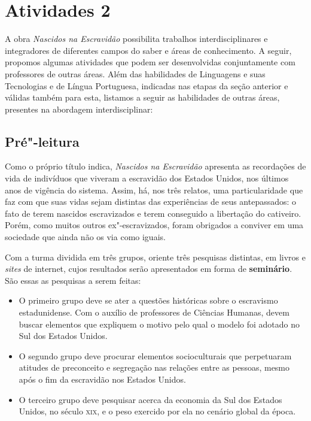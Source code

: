 \documentclass[12pt]{extarticle}
\begin{document}
\section{Atividades 2}

A obra \emph{Nascidos na Escravidão} possibilita trabalhos
interdisciplinares e integradores de diferentes campos do saber e áreas
de conhecimento. A seguir, propomos algumas atividades que podem ser
desenvolvidas conjuntamente com professores de outras áreas. Além das
habilidades de Linguagens e suas Tecnologias e de Língua Portuguesa,
indicadas nas etapas da seção anterior e válidas também para esta,
listamos a seguir as habilidades de outras áreas, presentes na abordagem
interdisciplinar:

\subsection{Pré"-leitura}


Como o próprio título indica, \emph{Nascidos na Escravidão}
apresenta as recordações de vida de indivíduos que viveram a escravidão
dos Estados Unidos, nos últimos anos de vigência do sistema. Assim, há,
nos três relatos, uma particularidade que faz com que suas vidas sejam
distintas das experiências de seus antepassados: o fato de terem
nascidos escravizados e terem conseguido a libertação do cativeiro.
Porém, como muitos outros ex"-escravizados, foram obrigados a conviver em
uma sociedade que ainda não os via como iguais.

Com a turma dividida em três grupos, oriente três pesquisas distintas,
em livros e \emph{sites} de internet, cujos resultados serão
apresentados em forma de \textbf{seminário}. São essas as pesquisas a
serem feitas:

\begin{itemize}
\item
  O primeiro grupo deve se ater a questões históricas sobre o escravismo
  estadunidense. Com o auxílio de professores de Ciências Humanas, devem
  buscar elementos que expliquem o motivo pelo qual o modelo foi adotado
  no Sul dos Estados Unidos.
\item
  O segundo grupo deve procurar elementos socioculturais que perpetuaram
  atitudes de preconceito e segregação nas relações entre as pessoas,
  mesmo após o fim da escravidão nos Estados Unidos.
\item
  O terceiro grupo deve pesquisar acerca da economia da Sul dos Estados
  Unidos, no século \textsc{xix}, e o peso exercido por ela no cenário global da
  época.
\end{itemize}
\end{document}
